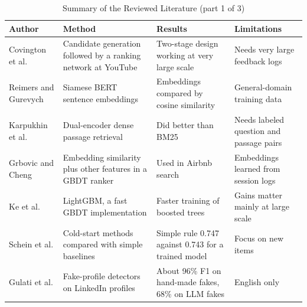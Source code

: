 \documentclass{FastFyp}
\begin{document}
\begin{table}[!ht]
\centering
\caption{Summary of the Reviewed Literature (part 1 of 3)}
\small
\setlength{\tabcolsep}{3pt}
\renewcommand{\arraystretch}{1.25}
\begin{tabular}{|p{3cm}|p{4cm}|p{4cm}|p{3cm}|}
\hline
\textbf{Author} & \textbf{Method} & \textbf{Results} & \textbf{Limitations} \\
\hline
Covington et al. \cite{ref:covington2016} & Candidate generation followed by a ranking network at YouTube & Two-stage design working at very large scale & Needs very large feedback logs \\
\hline
Reimers and Gurevych \cite{ref:reimers2019} & Siamese BERT sentence embeddings & Embeddings compared by cosine similarity & General-domain training data \\
\hline
Karpukhin et al. \cite{ref:karpukhin2020} & Dual-encoder dense passage retrieval & Did better than BM25 & Needs labeled question and passage pairs \\
\hline
Grbovic and Cheng \cite{ref:grbovic2018} & Embedding similarity plus other features in a GBDT ranker & Used in Airbnb search & Embeddings learned from session logs \\
\hline
Ke et al. \cite{ref:ke2017} & LightGBM, a fast GBDT implementation & Faster training of boosted trees & Gains matter mainly at large scale \\
\hline
Schein et al. \cite{ref:schein2002} & Cold-start methods compared with simple baselines & Simple rule 0.747 against 0.743 for a trained model & Focus on new items \\
\hline
Gulati et al. \cite{ref:gulati2025} & Fake-profile detectors on LinkedIn profiles & About 96\% F1 on hand-made fakes, 68\% on LLM fakes & English only \\
\hline
\end{tabular}
\label{tab:lr-summary-1}
\end{table}
\end{document}

